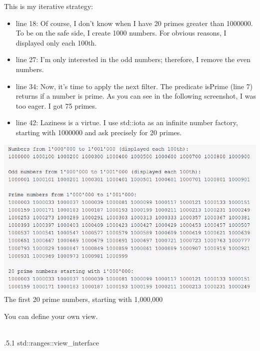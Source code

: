 This is my iterative strategy:

\begin{itemize}
\item 
line 18: Of course, I don’t know when I have 20 primes greater than 1000000. To be on the safe side, I create 1000 numbers. For obvious reasons, I displayed only each 100th.

\item 
line 27: I’m only interested in the odd numbers; therefore, I remove the even numbers.

\item 
line 34: Now, it’s time to apply the next filter. The predicate isPrime (line 7) returns if a number is prime. As you can see in the following screenshot, I was too eager. I got 75 primes.

\item 
line 42: Laziness is a virtue. I use std::iota as an infinite number factory, starting with 1000000 and ask precisely for 20 primes.
\end{itemize}

\begin{center}
\includegraphics[width=1.0\textwidth]{content/3/chapter5/images/1-2.png}\\
The first 20 prime numbers, starting with 1,000,000
\end{center}


You can define your own view.

\hspace*{\fill} \\ %
.5.1\hspace{0.2cm} std::ranges::view\_interface

